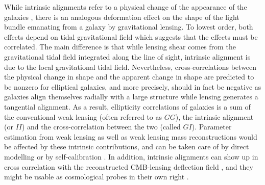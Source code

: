 \documentclass[a4paper,fleqn,usenatbib]{mnras}
\begin{document}
While intrinsic alignments refer to a physical change of the appearance of the galaxies \cite[for reviews, see][]{kiessling_galaxy_2015, joachimi_galaxy_2015, kirk_galaxy_2015, troxel_intrinsic_2015}, there is an analogous deformation effect on the shape of the light bundle emanating from a galaxy by gravitational lensing. To lowest order, both effects depend on tidal gravitational field which suggests that the effects must be correlated. The main difference is that while lensing shear comes from the gravitational tidal field integrated along the line of sight, intrinsic alignment is due to the local gravitational tidal field. Nevertheless, cross-correlations between the physical change in shape and the apparent change in shape are predicted to be nonzero for elliptical galaxies, and more precisely, should in fact be negative as galaxies align themselves radially with a large structure while lensing generates a tangential alignment. As a result, ellipticity correlations of galaxies is a sum of the conventional weak lensing (often referred to as $GG$), the intrinsic alignment (or $II$) and the cross-correlation between the two (called $GI$). Parameter estimation from weak lensing \cite{casarini_non-linear_2011, capranico_intrinsic_2013, blazek_beyond_2017} as well as weak lensing mass reconstructions \cite{fan_intrinsic_2007, chang_dark_2017} would be affected by these intrinsic contributions, and can be taken care of by direct modelling or by self-calibration \cite{troxel_self-calibration_2012, yao_effects_2017, yao_self-calibration_2018, yao_separating_2019, pedersen_first_2019}. In addition, intrinsic alignments can show up in cross correlation with the reconstructed CMB-lensing deflection field \cite{hirata_cross-correlation_2004, hall_intrinsic_2014, chisari_contamination_2015, larsen_intrinsic_2016, merkel_imitating_2017}, and they might be usable as cosmological probes in their own right \cite{pandya_can_2019, taruya_improving_2020}.
\end{document}

